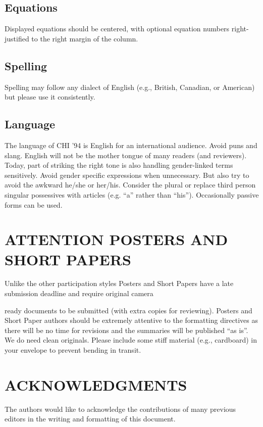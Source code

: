 \subsection{Equations}
Displayed equations should be centered, with 
optional equation numbers right-justified to the right margin of the column.

\subsection{Spelling}
Spelling may follow any dialect of English (e.g., British, 
Canadian, or American) but please use it consistently.

\subsection{Language}
The language of CHI '94 is English for an international 
audience. Avoid puns and  slang. English will not be the mother 
tongue of many readers (and reviewers).  Today, part of striking the 
right tone is also handling gender-linked terms sensitively.  Avoid 
gender specific expressions when unnecessary.  But also try to avoid 
the awkward he/she or her/his.  Consider the plural or replace third 
person singular possessives with articles (e.g. ``a'' rather than 
``his'').  Occasionally  passive forms can be used.

\section{ATTENTION POSTERS AND SHORT PAPERS}
Unlike the other 
participation styles Posters and Short Papers have a late submission 
deadline and require original camera

\newpage

ready documents to be submitted 
(with extra copies for reviewing). Posters and Short Paper authors 
should be extremely attentive to the formatting directives as there will
be no time for revisions and the summaries will be published ``as 
is''.  We do need clean originals. Please include some stiff material 
(e.g., cardboard) in your envelope to prevent bending in transit.

\section{ACKNOWLEDGMENTS}
The authors would like to acknowledge the contributions of many 
previous editors in the writing and formatting of this document.


